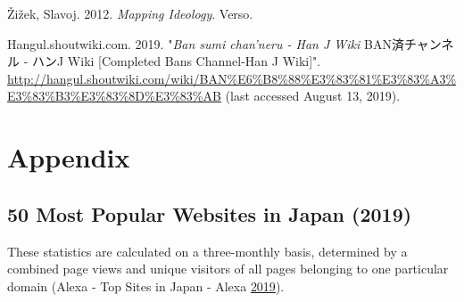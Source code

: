 \documentclass[10pt,british,A4paper,twoside]{memoir}
\begin{document}
\hypertarget{ref-zizek_mapping_2012}{}
Žižek, Slavoj. 2012. \emph{Mapping Ideology}. Verso.

\hypertarget{ref-j_wiki_completed_2019}{}
Hangul.shoutwiki.com. 2019. "\emph{Ban sumi chan'neru - Han J Wiki} BAN済チャンネル - ハンJ Wiki [Completed Bans Channel-Han J Wiki]".
\url{http://hangul.shoutwiki.com/wiki/BAN\%E6\%B8\%88\%E3\%83\%81\%E3\%83\%A3\%E3\%83\%B3\%E3\%83\%8D\%E3\%83\%AB} (last accessed August 13, 2019).

\endgroup

\newpage

\appendix
{} 

\chapter{Appendix}\label{appendix}

\section{50 Most Popular Websites in Japan
(2019)}\label{most-popular-websites-in-japan-2019}

These statistics are calculated on a three-monthly basis, determined by
a combined page views and unique visitors of all pages belonging to one
particular domain (Alexa - Top Sites in Japan - Alexa
\protect\hyperlink{ref-noauthor_alexa_2019}{2019}).

\begin{table}[!htb]
\footnotesize
\centering
\setlength{\tabcolsep}{5pt}
\caption{50 Most Popular Websites in Japan (2019)}\label{tab:50mostpopjp}
\end{table}
\end{document}
